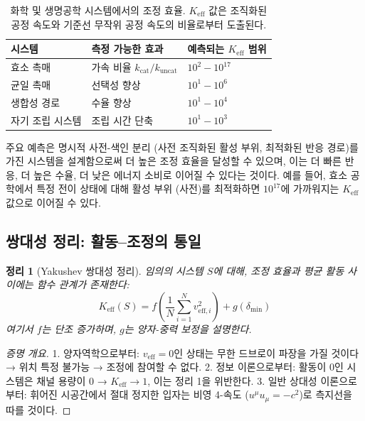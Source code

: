 \documentclass[11pt,a4paper]{article}
\newtheorem{theorem}{정리}
\begin{document}
\begin{table}[htbp]
\centering
\small
\begin{tabular}{p{}p{}p{}}
	\toprule
	\textbf{시스템} & \textbf{측정 가능한 효과} & \textbf{예측되는 $K_{\mathrm{eff}}$ 범위} \\
	\midrule
	효소 촉매 & 가속 비율 $k_{\text{cat}}/k_{\text{uncat}}$ & $10^2 - 10^{17}$ \\
	균일 촉매 & 선택성 향상 & $10^1 - 10^6$ \\
	생합성 경로 & 수율 향상 & $10^1 - 10^4$ \\
	자기 조립 시스템 & 조립 시간 단축 & $10^1 - 10^3$ \\
	\bottomrule
\end{tabular}
\caption{화학 및 생명공학 시스템에서의 조정 효율. $K_{\mathrm{eff}}$ 값은 조직화된 공정 속도와 기준선 무작위 공정 속도의 비율로부터 도출된다.}
\label{tab:chemical-keff}
\end{table}

주요 예측은 명시적 사전-색인 분리 (사전 조직화된 활성 부위, 최적화된 반응 경로)를 가진 시스템을 설계함으로써 더 높은 조정 효율을 달성할 수 있으며, 이는 더 빠른 반응, 더 높은 수율, 더 낮은 에너지 소비로 이어질 수 있다는 것이다. 예를 들어, 효소 공학에서 특정 전이 상태에 대해 활성 부위 (사전)를 최적화하면 $10^{17}$에 가까워지는 $K_{\mathrm{eff}}$ 값으로 이어질 수 있다.

\subsection{쌍대성 정리: 활동–조정의 통일}

\begin{theorem}[Yakushev 쌍대성 정리]
임의의 시스템 $S$에 대해, 조정 효율과 평균 활동 사이에는 함수 관계가 존재한다:
\[
K_{\mathrm{eff}}(S) = f\left( \frac{1}{N}\sum_{i=1}^N v_{\mathrm{eff},i}^2 \right) + g(\delta_{\min})
\]
여기서 $f$는 단조 증가하며, $g$는 양자-중력 보정을 설명한다.
\end{theorem}

\begin{proof}[증명 개요]
1. 양자역학으로부터: $v_{\mathrm{eff}} = 0$인 상태는 무한 드브로이 파장을 가질 것이다 → 위치 특정 불가능 → 조정에 참여할 수 없다.
2. 정보 이론으로부터: 활동이 0인 시스템은 채널 용량이 0 → $K_{\mathrm{eff}} \to 1$, 이는 정리 1을 위반한다.
3. 일반 상대성 이론으로부터: 휘어진 시공간에서 절대 정지한 입자는 비영 4-속도 ($u^\mu u_\mu = -c^2$)로 측지선을 따를 것이다.
\end{proof}
\end{document}
